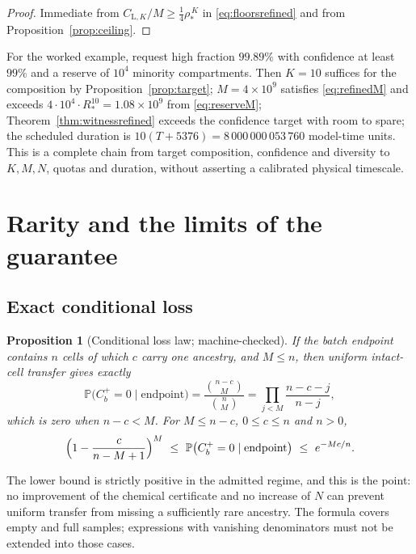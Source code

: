 \documentclass[11pt,a4paper]{article}
\theoremstyle{plain}
\newtheorem{proposition}[theorem]{Proposition}
\theoremstyle{definition}
\theoremstyle{remark}
\newcommand{\Prob}{\mathbb P}
\newcommand{\lo}{\mathrm L}
\begin{document}
\begin{proof}
Immediate from $C_{\lo,K}/M\ge\frac14\rho_*^{\,K}$ in \eqref{eq:floorsrefined}
and from Proposition~\ref{prop:ceiling}.
\end{proof}

For the worked example, request high fraction $99.89\%$ with confidence at least
$99\%$ and a reserve of $10^4$ minority compartments. Then $K=10$ suffices for
the composition by Proposition~\ref{prop:target};
$M=4\times10^{9}$ satisfies \eqref{eq:refinedM} and exceeds
$4\cdot10^4\cdot R_*^{10}=1.08\times10^{9}$ from \eqref{eq:reserveM};
Theorem~\ref{thm:witnessrefined} exceeds the confidence target with room to
spare; the scheduled duration is $10(T+5376)=8\,000\,000\,053\,760$ model-time
units. This is a complete chain from target composition, confidence and
diversity to $K,M,N$, quotas and duration, without asserting a calibrated
physical timescale.

\section{Rarity and the limits of the guarantee}\label{sec:rarity}

\subsection{Exact conditional loss}

\begin{proposition}[Conditional loss law; machine-checked]\label{prop:loss}
If the batch endpoint contains $n$ cells of which $c$ carry one ancestry, and
$M\le n$, then uniform intact-cell transfer gives exactly
\begin{equation}\label{eq:loss}
\Prob\bigl(C_b^+=0\mid\text{endpoint}\bigr)=\frac{\binom{n-c}{M}}{\binom nM}
=\prod_{j<M}\frac{n-c-j}{n-j},
\end{equation}
which is zero when $n-c<M$. For $M\le n-c$, $0\le c\le n$ and $n>0$,
\begin{equation}\label{eq:lossbounds}
\Bigl(1-\frac c{n-M+1}\Bigr)^{M}\ \le\
\Prob\bigl(C_b^+=0\mid\text{endpoint}\bigr)\ \le\ e^{-Mc/n}.
\end{equation}
\end{proposition}

The lower bound is strictly positive in the admitted regime, and this is the
point: no improvement of the chemical certificate and no increase of $N$ can
prevent uniform transfer from missing a sufficiently rare ancestry. The formula
covers empty and full samples; expressions with vanishing denominators must not
be extended into those cases.
\end{document}
